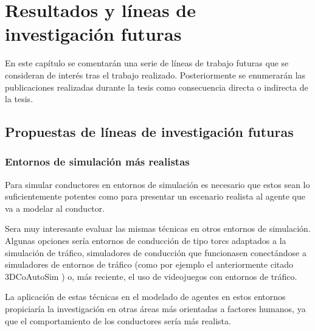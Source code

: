 \chapter{Resultados y líneas de investigación futuras}
\label{ch:future-work}

En este capítulo se comentarán una serie de líneas de trabajo futuras que se consideran de interés tras el trabajo realizado. Posteriormente se enumerarán las publicaciones realizadas durante la tesis como consecuencia directa o indirecta de la tesis.

\section{Propuestas de líneas de investigación futuras}

\subsection{Entornos de simulación más realistas}

Para simular conductores en entornos de simulación es necesario que estos sean lo suficientemente potentes como para presentar un escenario realista al agente que va a modelar al conductor.

Sera muy interesante evaluar las mismas técnicas en otros entornos de simulación. Algunas opciones sería entornos de conducción de tipo \ac{torcs} adaptados a la simulación de tráfico, simuladores de conducción que funcionasen conectándose a simuladores de entornos de tráfico (como por ejemplo el anteriormente citado 3DCoAutoSim \cite{olaverri2018implementation}) o, más reciente, el uso de videojuegos con entornos de tráfico.

La aplicación de estas técnicas en el modelado de agentes en estos entornos propiciaría la investigación en otras áreas más orientadas a factores humanos, ya que el comportamiento de los conductores sería más realista.

